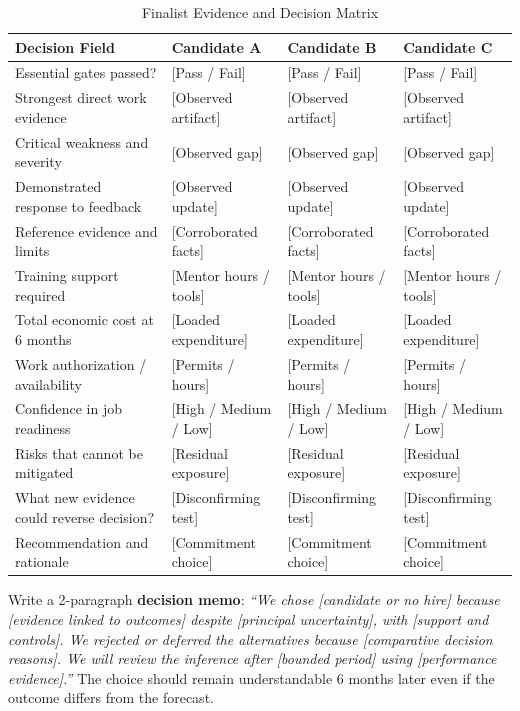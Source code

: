 \begin{table}[t]
\centering
\small
\caption{Finalist Evidence and Decision Matrix}
\label{tab:finalist_decision_matrix}
\begin{tabularx}{\textwidth}{p{4.2cm} X X X}
\toprule
\textbf{Decision Field} & \textbf{Candidate A} & \textbf{Candidate B} & \textbf{Candidate C} \\
\midrule
Essential gates passed? & [Pass / Fail] & [Pass / Fail] & [Pass / Fail] \\
Strongest direct work evidence & [Observed artifact] & [Observed artifact] & [Observed artifact] \\
Critical weakness and severity & [Observed gap] & [Observed gap] & [Observed gap] \\
Demonstrated response to feedback & [Observed update] & [Observed update] & [Observed update] \\
Reference evidence and limits & [Corroborated facts] & [Corroborated facts] & [Corroborated facts] \\
Training support required & [Mentor hours / tools] & [Mentor hours / tools] & [Mentor hours / tools] \\
Total economic cost at 6 months & [Loaded expenditure] & [Loaded expenditure] & [Loaded expenditure] \\
Work authorization / availability & [Permits / hours] & [Permits / hours] & [Permits / hours] \\
Confidence in job readiness & [High / Medium / Low] & [High / Medium / Low] & [High / Medium / Low] \\
Risks that cannot be mitigated & [Residual exposure] & [Residual exposure] & [Residual exposure] \\
What new evidence could reverse decision? & [Disconfirming test] & [Disconfirming test] & [Disconfirming test] \\
Recommendation and rationale & [Commitment choice] & [Commitment choice] & [Commitment choice] \\
\bottomrule
\end{tabularx}
\end{table}

Write a 2-paragraph \textbf{decision memo}: \textit{``We chose [candidate or no hire] because [evidence linked to outcomes] despite [principal uncertainty], with [support and controls]. We rejected or deferred the alternatives because [comparative decision reasons]. We will review the inference after [bounded period] using [performance evidence].''} The choice should remain understandable 6 months later even if the outcome differs from the forecast.


